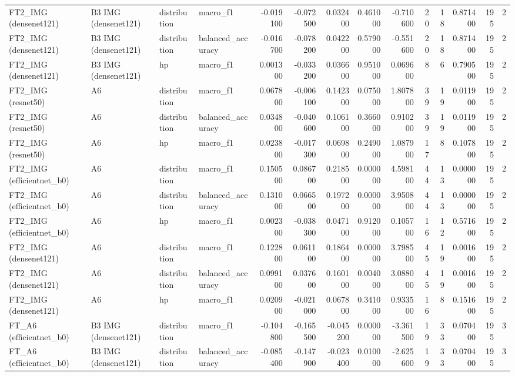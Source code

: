 \begin{table}
\begin{tabular}{llllrrrrrrrrrr}
FT2\_IMG (densenet121) & B3 IMG (densenet121) & distribution & macro\_f1 & -0.019100 & -0.072500 & 0.032400 & 0.461000 & -0.710600 & 20 & 18 & 0.871400 & 195 & 2 \\
FT2\_IMG (densenet121) & B3 IMG (densenet121) & distribution & balanced\_accuracy & -0.016700 & -0.078200 & 0.042200 & 0.579000 & -0.551600 & 20 & 18 & 0.871400 & 195 & 2 \\
FT2\_IMG (densenet121) & B3 IMG (densenet121) & hp & macro\_f1 & 0.001300 & -0.033200 & 0.036600 & 0.951000 & 0.069600 & 8 & 6 & 0.790500 & 195 & 2 \\
FT2\_IMG (resnet50) & A6 & distribution & macro\_f1 & 0.067800 & -0.006100 & 0.142300 & 0.075000 & 1.807800 & 39 & 19 & 0.011900 & 195 & 2 \\
FT2\_IMG (resnet50) & A6 & distribution & balanced\_accuracy & 0.034800 & -0.040600 & 0.106100 & 0.366000 & 0.910200 & 39 & 19 & 0.011900 & 195 & 2 \\
FT2\_IMG (resnet50) & A6 & hp & macro\_f1 & 0.023800 & -0.017300 & 0.069800 & 0.249000 & 1.087900 & 17 & 8 & 0.107800 & 195 & 2 \\
FT2\_IMG (efficientnet\_b0) & A6 & distribution & macro\_f1 & 0.150500 & 0.086700 & 0.218500 & 0.000000 & 4.598100 & 44 & 13 & 0.000000 & 195 & 2 \\
FT2\_IMG (efficientnet\_b0) & A6 & distribution & balanced\_accuracy & 0.131000 & 0.066500 & 0.197200 & 0.000000 & 3.950800 & 44 & 13 & 0.000000 & 195 & 2 \\
FT2\_IMG (efficientnet\_b0) & A6 & hp & macro\_f1 & 0.002300 & -0.038300 & 0.047100 & 0.912000 & 0.105700 & 16 & 12 & 0.571600 & 195 & 2 \\
FT2\_IMG (densenet121) & A6 & distribution & macro\_f1 & 0.122800 & 0.061100 & 0.186400 & 0.000000 & 3.798500 & 45 & 19 & 0.001600 & 195 & 2 \\
FT2\_IMG (densenet121) & A6 & distribution & balanced\_accuracy & 0.099100 & 0.037600 & 0.160100 & 0.004000 & 3.088000 & 45 & 19 & 0.001600 & 195 & 2 \\
FT2\_IMG (densenet121) & A6 & hp & macro\_f1 & 0.020900 & -0.021000 & 0.067800 & 0.341000 & 0.933500 & 16 & 8 & 0.151600 & 195 & 2 \\
FT\_A6 (efficientnet\_b0) & B3 IMG (densenet121) & distribution & macro\_f1 & -0.104800 & -0.165500 & -0.045200 & 0.000000 & -3.361500 & 19 & 33 & 0.070400 & 195 & 3 \\
FT\_A6 (efficientnet\_b0) & B3 IMG (densenet121) & distribution & balanced\_accuracy & -0.085400 & -0.147900 & -0.023400 & 0.010000 & -2.625600 & 19 & 33 & 0.070400 & 195 & 3 \\

\end{tabular}
\end{table}

